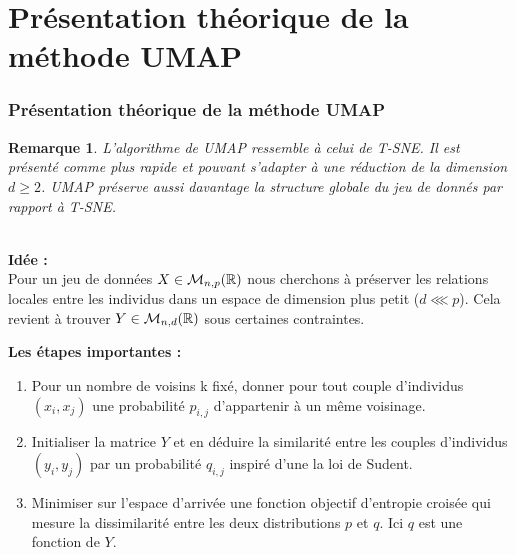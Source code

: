 \documentclass{beamer}
\newtheorem{rmq}{Remarque}
\theoremstyle{definition}
\begin{document}
\section{Présentation théorique de la méthode UMAP}
\begin{frame}
\frametitle{Présentation théorique de la méthode UMAP}
\begin{rmq}
	L'algorithme de UMAP ressemble à celui de T-SNE. Il est présenté comme plus rapide et pouvant s'adapter à une réduction de la dimension $d\geq2$. UMAP préserve aussi davantage la structure globale du jeu de donnés par rapport à T-SNE. %
\end{rmq}
\quad \\[0.15cm]
	\textcolor{modernvert}{\textbf{Idée :}}\\ Pour un jeu de données $X\in\mathcal{M}_{n,p}(\mathbb{R})$ nous cherchons à préserver les relations locales entre les individus dans un espace de dimension plus petit ($d \lll p$). Cela revient à trouver $Y\in\mathcal{M}_{n,d}(\mathbb{R})$ sous certaines contraintes.\\
	
	
\end{frame}

\begin{frame}
\textcolor{modernvert}{\textbf{Les étapes importantes :}}\\[0.5cm]
\begin{enumerate}
	\item  Pour un nombre de voisins k fixé, donner pour tout couple d'individus $(x_i,x_j)$ une probabilité $p_{i,j}$ d'appartenir à un même voisinage.
	\item Initialiser la matrice $Y$ et en déduire la similarité entre les couples d'individus $(y_i,y_j)$ par un probabilité $q_{i,j}$ inspiré d'une la loi de Sudent.
	\item Minimiser sur l'espace d'arrivée une fonction objectif d’entropie croisée qui mesure la dissimilarité entre les deux distributions $p$ et $q$. Ici $q$ est une fonction de $Y$.
\end{enumerate}	
	
\end{frame}
\end{document}
